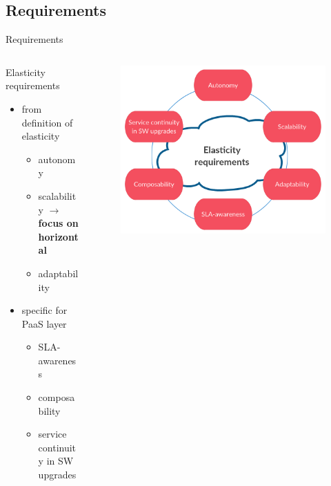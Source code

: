 \subsection{Requirements}
\begin{frame}{Requirements}
	\only<1>
	{
		\begin{columns}
			\begin{column}{0.6\textwidth}
				Elasticity requirements
				\begin{itemize}
					\item{\footnotesize{from definition of elasticity}}
					\begin{itemize}
						\item{\scriptsize{autonomy}}
						\item{\scriptsize{scalability $\rightarrow{}$ \textbf{focus on horizontal}}}
						\item{\scriptsize{adaptability}}
					\end{itemize}
					\item{\footnotesize{specific for PaaS layer}}
					\begin{itemize}
						\item{\scriptsize{SLA-awareness}}
						\item{\scriptsize{composability}}
						\item{\scriptsize{service continuity in SW upgrades}}
					\end{itemize}
				\end{itemize}
			\end{column}
			\begin{column}{0.4\textwidth}
				\begin{figure}
					\centering{}
					\includegraphics[scale=0.14]{images/elasticity-requirements.png}

\end{figure}
\end{column}
\end{columns}}
\end{frame}
